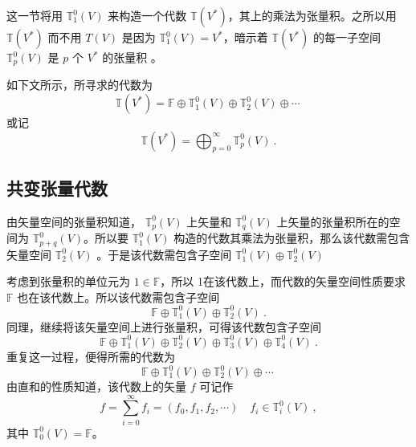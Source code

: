 
\begin{issues}
\end{issues}


这一节将用 $\mathbb T_1^0(V)$ 来构造一个代数 $\mathbb T(V^*)$，其上的乘法为张量积。之所以用 $\mathbb T(V^*)$ 而不用 $T(V)$ 是因为 $\mathbb T_1^0(V)=V^*$，暗示着 $\mathbb T(V^*)$ 的每一子空间 $\mathbb T_p^0(V)$ 是 $p$ 个 $V^*$ 的张量积 。 

如下文所示，所寻求的代数为
\begin{equation}
\mathbb T(V^*)=\mathbb F\oplus\mathbb T_1^0(V)\oplus\mathbb T_2^0(V)\oplus\cdots~
\end{equation}
或记
\begin{equation}
\mathbb T(V^*)=\bigoplus_{p=0}^\infty\mathbb T_p^0(V)~.
\end{equation}
\subsection{共变张量代数}
由矢量空间的张量积知道， $\mathbb T_p^0(V)$ 上矢量和 $\mathbb T_q^0(V)$ 上矢量的张量积所在的空间为  $\mathbb T_{p+q}^0(V)$。所以要 $\mathbb T_1^0(V)$ 构造的代数其乘法为张量积，那么该代数需包含矢量空间 $\mathbb T_2^0(V)$ 。于是该代数需包含子空间 $\mathbb T_1^0(V)\oplus\mathbb T_2^0(V) $

 考虑到张量积的单位元为 $1\in\mathbb F$，所以 1在该代数上，而代数的矢量空间性质要求 $\mathbb F$ 也在该代数上。所以该代数需包含子空间
\begin{equation}
\mathbb F\oplus\mathbb T_1^0(V)\oplus\mathbb T_2^0(V) ~.
\end{equation} 
同理，继续将该矢量空间上进行张量积，可得该代数包含子空间
\begin{equation}
\mathbb F\oplus\mathbb T_1^0(V)\oplus\mathbb T_2^0(V)\oplus\mathbb T_3^0(V)\oplus\mathbb T_4^0(V)~.
\end{equation}
重复这一过程，便得所需的代数为
\begin{equation}
\mathbb F\oplus\mathbb T_1^0(V)\oplus\mathbb T_2^0(V)\oplus\cdots~
\end{equation}
由直和的性质知道，该代数上的矢量 $f$ 可记作
\begin{equation}\label{eq_TenAlg_5}
f=\sum_{i=0}^\infty f_i=(f_0,f_1,f_2,\cdots) \quad f_i\in\mathbb T_i^0(V)~,
\end{equation}
其中 $\mathbb T_0^0(V)=\mathbb F$。

